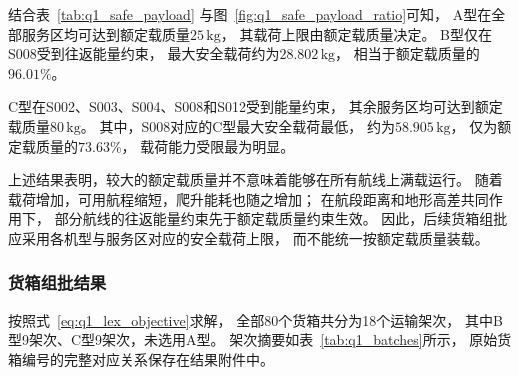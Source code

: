 \documentclass[bwprint]{gmcmthesis}
\begin{document}
结合表~\ref{tab:q1_safe_payload}
与图~\ref{fig:q1_safe_payload_ratio}可知，
A型在全部服务区均可达到额定载质量$25\,\mathrm{kg}$，
其载荷上限由额定载质量决定。
B型仅在S008受到往返能量约束，
最大安全载荷约为$28.802\,\mathrm{kg}$，
相当于额定载质量的$96.01\%$。

C型在S002、S003、S004、S008和S012受到能量约束，
其余服务区均可达到额定载质量$80\,\mathrm{kg}$。
其中，S008对应的C型最大安全载荷最低，
约为$58.905\,\mathrm{kg}$，
仅为额定载质量的$73.63\%$，
载荷能力受限最为明显。

上述结果表明，较大的额定载质量并不意味着能够在所有航线上满载运行。
随着载荷增加，可用航程缩短，爬升能耗也随之增加；
在航段距离和地形高差共同作用下，
部分航线的往返能量约束先于额定载质量约束生效。
因此，后续货箱组批应采用各机型与服务区对应的安全载荷上限，
而不能统一按额定载质量装载。

\subsubsection{货箱组批结果}

按照式~\eqref{eq:q1_lex_objective}求解，
全部80个货箱共分为18个运输架次，
其中B型9架次、C型9架次，未选用A型。
架次摘要如表~\ref{tab:q1_batches}所示，
原始货箱编号的完整对应关系保存在结果附件中。
\end{document}
